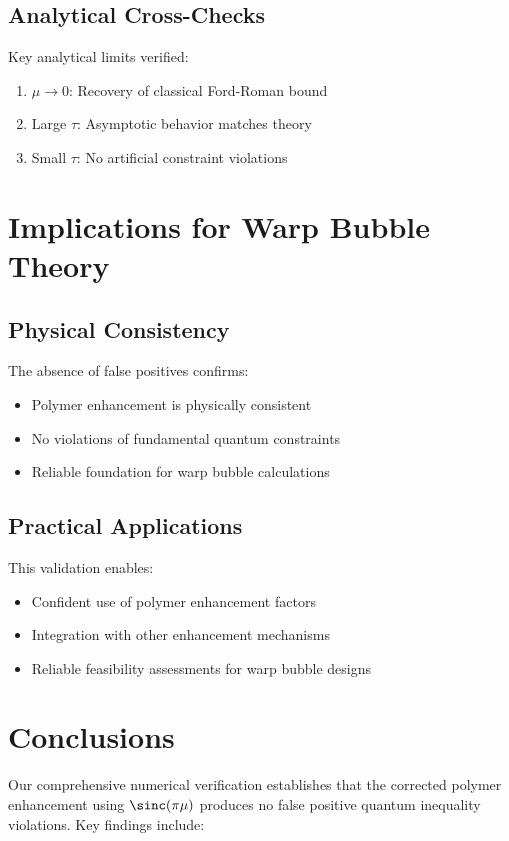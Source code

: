 \documentclass[11pt,a4paper]{article}
\begin{document}
\subsection{Analytical Cross-Checks}

Key analytical limits verified:
\begin{enumerate}
\item $\mu \to 0$: Recovery of classical Ford-Roman bound
\item Large $\tau$: Asymptotic behavior matches theory
\item Small $\tau$: No artificial constraint violations
\end{enumerate}

\section{Implications for Warp Bubble Theory}

\subsection{Physical Consistency}

The absence of false positives confirms:
\begin{itemize}
\item Polymer enhancement is physically consistent
\item No violations of fundamental quantum constraints
\item Reliable foundation for warp bubble calculations
\end{itemize}

\subsection{Practical Applications}

This validation enables:
\begin{itemize}
\item Confident use of polymer enhancement factors
\item Integration with other enhancement mechanisms
\item Reliable feasibility assessments for warp bubble designs
\end{itemize}

\section{Conclusions}

Our comprehensive numerical verification establishes that the corrected polymer enhancement using $\sinc(\pi\mu)$ produces no false positive quantum inequality violations. Key findings include:
\end{document}

